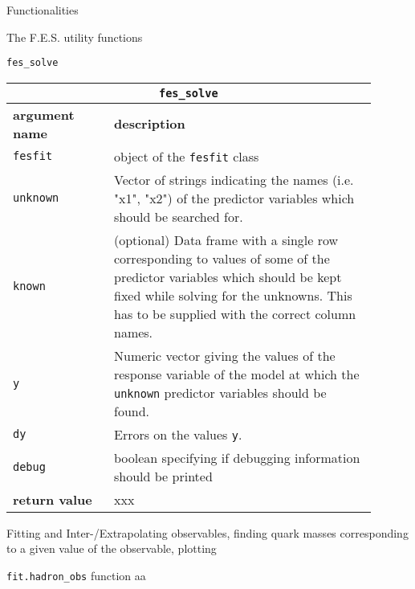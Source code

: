 \documentclass[10pt,a5paper]{article}
\begin{document}
\begin{section}{Functionalities}
\begin{subsection}{The F.E.S. utility functions}
\begin{subsubsection}{ {\tt fes\_solve} }
{ \centering
\begin{tabular}{|p{0.25\linewidth}|p{0.65\linewidth}|}
\hline
\multicolumn{2}{|c|}{ {\tt fes\_solve} } \\
\hline \hline \textbf{argument name} & \textbf{description} \\
\hline {\tt fesfit} & object of the {\tt fesfit} class \\ 
{\tt unknown} & Vector of strings indicating the names (i.e. "x1", "x2") of the predictor variables which should be searched for. \\ 
{\tt known} & (optional) Data frame with a single row corresponding to values of some of the predictor variables which should be kept fixed while solving for the unknowns. This has to be supplied with the correct column names. \\
{\tt y} & Numeric vector giving the values of the response variable of the model at which the {\tt unknown} predictor variables should be found. \\
{\tt dy} & Errors on the values {\tt y}. \\
{\tt debug} & boolean specifying if debugging information should be printed \\
\hline \hline
\textbf{return value} & xxx \\
\hline
\end{tabular}
} %

\end{subsubsection} %

\end{subsection} %


\begin{subsection}{Fitting and Inter-/Extrapolating observables, finding quark masses corresponding to a given value of the observable, plotting}

\begin{subsubsection}{{\tt fit.hadron\_obs} function}
aa
\end{subsubsection}

\end{subsection} %

\end{section} %
\end{document}
